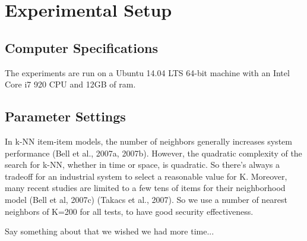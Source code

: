 
\section{Experimental Setup}

\subsection{Computer Specifications}

The experiments are run on a Ubuntu 14.04 LTS 64-bit
machine with an Intel Core i7 920 CPU and 12GB of ram.

\subsection{Parameter Settings}


In k-NN item-item models, the number of neighbors 
generally increases system performance (Bell et al., 2007a, 2007b). However, the quadratic 
complexity of the search for k-NN, whether in time or space, is quadratic. So there's always a 
tradeoff for an industrial system \cite{Deshpande2004, Cremonesi2010} to select a 
reasonable value for K. Moreover, many recent studies are limited to a few tens of items for their 
neighborhood model (Bell et al, 2007c) (Takacs et al., 2007). So we use a number of nearest 
neighbors of K=200 for all tests, to have good security effectiveness. 



Say something about that we wished we had more time...